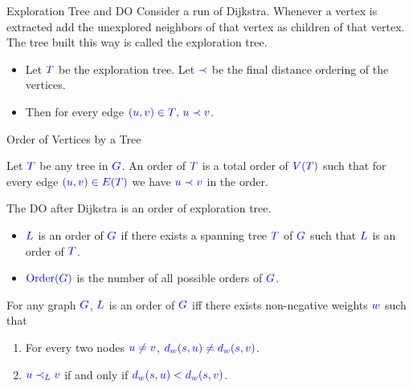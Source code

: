 \documentclass[10pt]{beamer}
\DeclareMathOperator{\order}{Order}
\begin{document}
\begin{frame}{Exploration Tree and DO}
	Consider a run of Dijkstra. Whenever a vertex is extracted add the unexplored neighbors of that vertex as children of that vertex. The tree built this way is called the exploration tree.\pause \vfill

	\begin{itemize}
		\item Let $\mathcolor{blue}{T}$ be the exploration tree. Let $\mathcolor{blue}{\prec}$ be the final distance ordering of the vertices.\pause \vfill
		\item Then for every edge $\mathcolor{blue}{(u,v)\in T$, $u\prec v}$.
	\end{itemize}
\end{frame}
\begin{frame}{Order of Vertices by a Tree}
	\begin{definition}[Order of $T$]
		Let $\mathcolor{blue}{T}$ be any tree in $\mathcolor{blue}{G}$. An order of $\mathcolor{blue}{T}$ is a total order of $\mathcolor{blue}{V(T)}$ such that for every edge $\mathcolor{blue}{(u,v)\in E(T)}$ we have $\mathcolor{blue}{u\prec v}$ in the order.
	\end{definition}\pause\vfill
	The DO after Dijkstra is an order of exploration tree.
	\begin{itemize}
		\item $\mathcolor{blue}{L}$ is an order of $\mathcolor{blue}{G}$ if there exists a spanning tree $\mathcolor{blue}{T}$ of $\mathcolor{blue}{G}$ such that $\mathcolor{blue}{L}$ is an order of $\mathcolor{blue}{T}$.\pause
		\item $\mathcolor{blue}{\order(G)}$ is the number of all possible orders of $\mathcolor{blue}{G}$.
	\end{itemize}\pause \vfill

	\begin{lemma}
		For any graph $\mathcolor{blue}{G}$, $\mathcolor{blue}{L}$ is an order of $\mathcolor{blue}{G}$ iff there exists non-negative weights $\mathcolor{blue}{w}$ such that \begin{enumerate}
			\item For every two nodes $\mathcolor{blue}{u\neq v}$, $\mathcolor{blue}{d_w(s,u)\neq d_w(s,v)}$.
			\item $\mathcolor{blue}{u\prec_L v}$ if and only if $\mathcolor{blue}{d_w(s,u)<d_w(s, v)}$.
		\end{enumerate}
	\end{lemma}
\end{frame}
\end{document}
